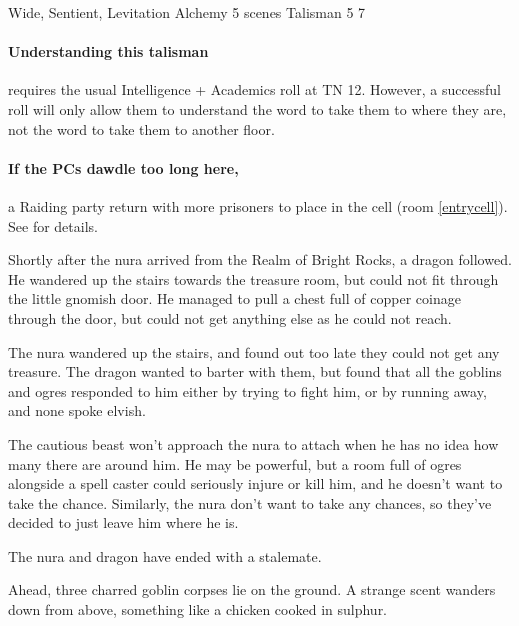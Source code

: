 \begin{multicols}{2}
%
{Wide, Sentient, Levitation}%
{Alchemy}%
{5 scenes}%
{Talisman}%
{5}%
{7}

\paragraph{Understanding this talisman}
requires the usual Intelligence + Academics roll at TN 12.
However, a successful roll will only allow them to understand the word to take them to where they are, not the word to take them to another floor.

\paragraph{If the PCs dawdle too long here,}
a Raiding party return with more prisoners to place in the cell (room \ref{entrycell}).
See  for details.



\begin{exampletext}

  Shortly after the nura arrived from the Realm of Bright Rocks, a dragon followed.
  He wandered up the stairs towards the treasure room, but could not fit through the little gnomish door.
  He managed to pull a chest full of copper coinage through the door, but could not get anything else as he could not reach.

  The nura wandered up the stairs, and found out too late they could not get any treasure.
  The dragon wanted to barter with them, but found that all the goblins and ogres responded to him either by trying to fight him, or by running away, and none spoke elvish.

  The cautious beast won't approach the nura to attach when he has no idea how many there are around him.
  He may be powerful, but a room full of ogres alongside a spell caster could seriously injure or kill him, and he doesn't want to take the chance.
  Similarly, the nura don't want to take any chances, so they've decided to just leave him where he is.

  The nura and dragon have ended with a stalemate.

\end{exampletext}

\begin{boxtext}

  Ahead, three charred goblin corpses lie on the ground.
  A strange scent wanders down from above, something like a chicken cooked in sulphur.


\end{boxtext}
\end{multicols}
